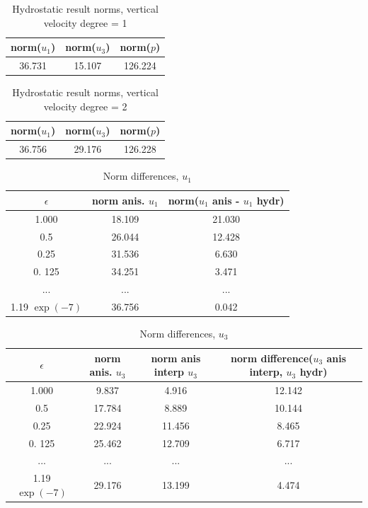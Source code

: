 \documentclass[11pt]{article}
\begin{document}
\begin{table}[H]
\caption{Hydrostatic result norms, vertical velocity degree = 1}
\begin{center}
\begin{tabular}{ccc}
    \hline
    norm($u_1$) & norm($u_3$) & norm($p$) \\
    \hline
    36.731 & 15.107 & 126.224 \\
    \hline
\end{tabular}
\end{center}
\end{table}

\begin{table}[H]
\caption{Hydrostatic result norms, vertical velocity degree = 2}
\begin{center}
\begin{tabular}{ccc}
    \hline
    norm($u_1$) & norm($u_3$) & norm($p$) \\
    \hline
     36.756 & 29.176 & 126.228 \\
    \hline
\end{tabular}
\end{center}
\end{table}

\begin{table}[H]
\caption{Norm differences, $u_1$}
\begin{center}
\begin{tabular}{ccc}
    \hline
    $\epsilon$ & norm anis. $u_1$ &  norm($u_1$ anis - $u_1$ hydr)\\
    \hline
    1.000 & 18.109 & 21.030 \\
    0.5 & 26.044 & 12.428 \\
    0.25 & 31.536 & 6.630 \\   
    0. 125 & 34.251& 3.471 \\
    ... & ... & ... \\
    1.19 $\exp(-7)$ &36.756 & 0.042 \\       
    \hline
\end{tabular}
\end{center}
\end{table}

\begin{table}[H]
\caption{Norm differences, $u_3$}
\begin{center}
\begin{tabular}{cccc}
    \hline
    $\epsilon$ & norm anis. $u_3$ & norm anis interp $u_3$ & norm difference($u_3$ anis interp, $u_3$ hydr)\\
    \hline
    1.000 & 9.837 & 4.916 & 12.142 \\
    0.5 & 17.784 & 8.889 & 10.144 \\
    0.25 & 22.924 & 11.456 & 8.465 \\    
    0. 125 & 25.462 & 12.709 & 6.717 \\
    ... & ... & ... & ... \\    
    1.19 $\exp(-7)$ & 29.176 & 13.199 & 4.474 \\        
    \hline
\end{tabular}
\end{center}
\end{table}
\end{document}
